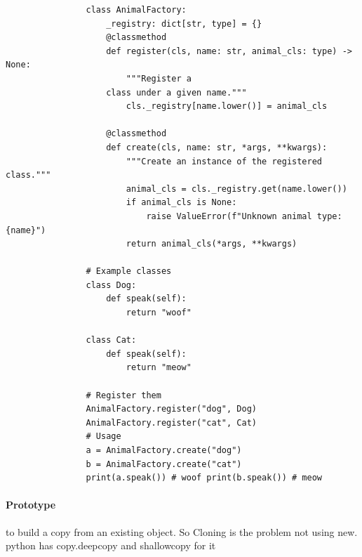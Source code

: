 \documentclass[a4paper]{article}
\begin{document}
            
            
            \begin{verbatim}
                class AnimalFactory:
                    _registry: dict[str, type] = {}
                    @classmethod
                    def register(cls, name: str, animal_cls: type) -> None:
                        """Register a
                    class under a given name."""
                        cls._registry[name.lower()] = animal_cls
            
                    @classmethod
                    def create(cls, name: str, *args, **kwargs):
                        """Create an instance of the registered class."""
                        animal_cls = cls._registry.get(name.lower())
                        if animal_cls is None:
                            raise ValueError(f"Unknown animal type: {name}")
                        return animal_cls(*args, **kwargs)
            
                # Example classes
                class Dog:
                    def speak(self):
                        return "woof"
            
                class Cat:
                    def speak(self):
                        return "meow"
            
                # Register them
                AnimalFactory.register("dog", Dog)
                AnimalFactory.register("cat", Cat)
                # Usage
                a = AnimalFactory.create("dog")
                b = AnimalFactory.create("cat")
                print(a.speak()) # woof print(b.speak()) # meow
            \end{verbatim}
        
        \paragraph{Prototype}
            to build a copy from an existing object. So Cloning is the problem not using new. python has copy.deepcopy and shallowcopy for it
\end{document}
